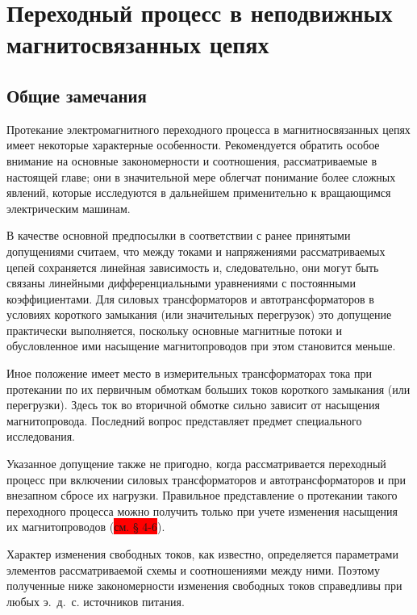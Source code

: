 \chapter{Переходный процесс в неподвижных магнитосвязанных цепях}
\label{chap:4 perehodnyi_protcess_v_nepodvizhnykh_magnitosviazannykh_tcepiakh}

\section{Общие замечания}
\label{sec:4-1}

Протекание электромагнитного переходного процесса в магнитносвязанных цепях имеет некоторые характерные особенности. Рекомендуется обратить особое внимание на основные закономерности и соотношения, рассматриваемые в настоящей главе; они в значительной мере облегчат понимание более сложных явлений, которые исследуются в дальнейшем применительно к вращающимся электрическим машинам.

В качестве основной предпосылки в соответствии с ранее принятыми допущениями считаем, что между токами и напряжениями рассматриваемых цепей сохраняется линейная зависимость и, следовательно, они могут быть связаны линейными дифференциальными уравнениями с постоянными коэффициентами. Для силовых трансформаторов и автотрансформаторов в условиях короткого замыкания (или значительных перегрузок) это допущение практически выполняется, поскольку основные магнитные потоки и обусловленное ими насыщение магнитопроводов при этом становится меньше.

Иное положение имеет место в измерительных трансформаторах тока при протекании по их первичным обмоткам больших токов короткого замыкания (или перегрузки). Здесь ток во вторичной обмотке сильно зависит от насыщения магнитопровода. Последний вопрос представляет предмет специального исследования.

Указанное допущение также не пригодно, когда рассматривается переходный процесс при включении
силовых трансформаторов и автотрансформаторов и при внезапном сбросе их нагрузки. Правильное представление о протекании такого переходного процесса можно получить только при учете изменения насыщения их магнитопроводов (\colorbox{red}{см. § 4-6}).

Характер изменения свободных токов, как известно, определяется параметрами элементов рассматриваемой схемы и соотношениями между ними. Поэтому полученные ниже закономерности изменения свободных токов справедливы при любых э.~д.~с. источников питания.

